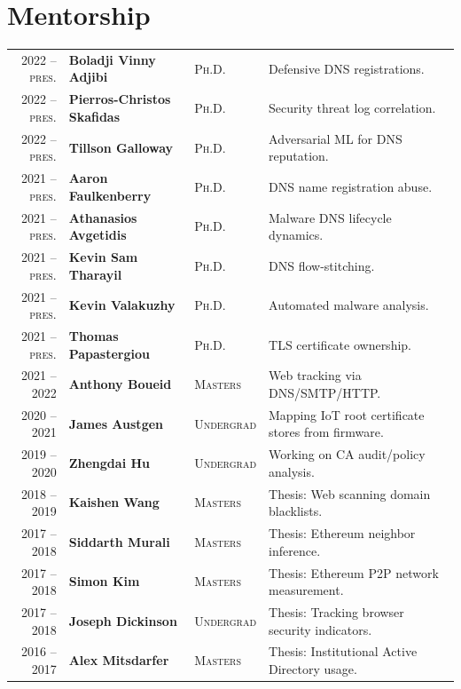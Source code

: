 \documentclass[10pt,singlecolumn]{article} %
\begin{document}
\section{Mentorship} 
\begin{tabular}{rlll}
2022 -- \textsc{pres.} & \textbf{Boladji Vinny Adjibi} & \textsc{Ph.D.} & Defensive DNS registrations.\\ 
2022 -- \textsc{pres.} & \textbf{Pierros-Christos Skafidas} & \textsc{Ph.D.} & Security threat log correlation.\\ 
2022 -- \textsc{pres.} & \textbf{Tillson Galloway} & \textsc{Ph.D.} & Adversarial ML for DNS reputation.\\ 
2021 -- \textsc{pres.} & \textbf{Aaron Faulkenberry} & \textsc{Ph.D.} & DNS name registration abuse.\\ 
2021 -- \textsc{pres.} & \textbf{Athanasios Avgetidis} & \textsc{Ph.D.} & Malware DNS lifecycle dynamics.\\ 
2021 -- \textsc{pres.} & \textbf{Kevin Sam Tharayil} & \textsc{Ph.D.} & DNS flow-stitching.\\ 
2021 -- \textsc{pres.} & \textbf{Kevin Valakuzhy} & \textsc{Ph.D.} & Automated malware analysis.\\ 
2021 -- \textsc{pres.} & \textbf{Thomas Papastergiou} & \textsc{Ph.D.} & TLS certificate ownership.\\ 
2021 -- 2022			 & \textbf{Anthony Boueid} & \textsc{Masters} & Web tracking via DNS/SMTP/HTTP.\\ 
2020 -- 2021             & \textbf{James Austgen} & \textsc{Undergrad} & Mapping IoT root certificate stores from firmware.\\ 
2019 -- 2020	         & \textbf{Zhengdai Hu} & \textsc{Undergrad} & Working on CA audit/policy analysis.\\ 
2018 -- 2019	         & \textbf{Kaishen Wang} & \textsc{Masters} & Thesis: Web scanning domain blacklists.\\
2017 -- 2018	         & \textbf{Siddarth Murali} & \textsc{Masters} & Thesis: Ethereum neighbor inference.\\ 
2017 -- 2018	         & \textbf{Simon Kim} & \textsc{Masters} & Thesis: Ethereum P2P network measurement.\\  
2017 -- 2018	         & \textbf{Joseph Dickinson} & \textsc{Undergrad} & Thesis: Tracking browser security indicators.\\  
2016 -- 2017	         & \textbf{Alex Mitsdarfer} & \textsc{Masters} & Thesis: Institutional Active Directory usage.\\ 
\end{tabular}\\
\end{document}
